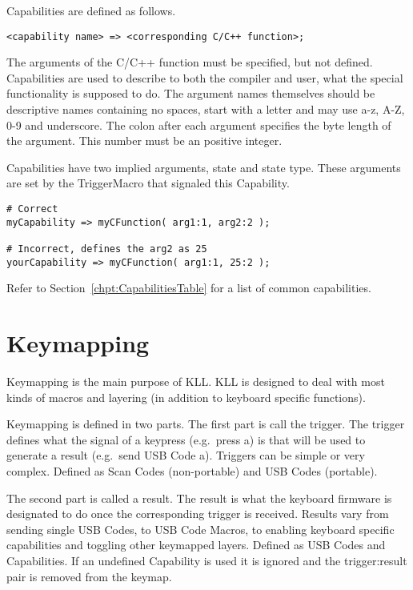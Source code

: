 \documentclass{kiibohd-template}
\begin{document}
Capabilities are defined as follows.

\begin{lstlisting}
<capability name> => <corresponding C/C++ function>;
\end{lstlisting}

The arguments of the C/C++ function must be specified, but not defined.
Capabilities are used to describe to both the compiler and user, what the special functionality is supposed to do.
The argument names themselves should be descriptive names containing no spaces, start with a letter and may use a-z, A-Z, 0-9 and underscore.
The colon after each argument specifies the byte length of the argument.
This number must be an positive integer.

Capabilities have two implied arguments, state and state type.
These arguments are set by the TriggerMacro that signaled this Capability.

\begin{lstlisting}
# Correct
myCapability => myCFunction( arg1:1, arg2:2 );

# Incorrect, defines the arg2 as 25
yourCapability => myCFunction( arg1:1, 25:2 );
\end{lstlisting}

Refer to Section~\ref{chpt:CapabilitiesTable} for a list of common capabilities.


\chapter{Keymapping}

Keymapping is the main purpose of KLL.
KLL is designed to deal with most kinds of macros and layering (in addition to keyboard specific functions).

Keymapping is defined in two parts.
The first part is call the trigger.
The trigger defines what the signal of a keypress (e.g.\ press a) is that will be used to generate a result (e.g.\ send USB Code a).
Triggers can be simple or very complex.
Defined as Scan Codes (non-portable) and USB Codes (portable).

The second part is called a result.
The result is what the keyboard firmware is designated to do once the corresponding trigger is received.
Results vary from sending single USB Codes, to USB Code Macros, to enabling keyboard specific capabilities and toggling other keymapped layers.
Defined as USB Codes and Capabilities.
If an undefined Capability is used it is ignored and the trigger:result pair is removed from the keymap.
\end{document}
